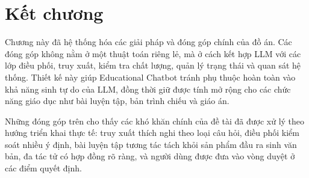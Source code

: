 \documentclass[../DoAn.tex]{subfiles}
\begin{document}
\section{Kết chương}

Chương này đã hệ thống hóa các giải pháp và đóng góp chính của đồ án. Các đóng góp không nằm ở một thuật toán riêng lẻ, mà ở cách kết hợp LLM với các lớp điều phối, truy xuất, kiểm tra chất lượng, quản lý trạng thái và quan sát hệ thống. Thiết kế này giúp Educational Chatbot tránh phụ thuộc hoàn toàn vào khả năng sinh tự do của LLM, đồng thời giữ được tính mở rộng cho các chức năng giáo dục như bài luyện tập, bản trình chiếu và giáo án.

Những đóng góp trên cho thấy các khó khăn chính của đề tài đã được xử lý theo hướng triển khai thực tế: truy xuất thích nghi theo loại câu hỏi, điều phối kiểm soát nhiều ý định, bài luyện tập tương tác tách khỏi sản phẩm đầu ra sinh văn bản, đa tác tử có hợp đồng rõ ràng, và người dùng được đưa vào vòng duyệt ở các điểm quyết định.
\end{document}

